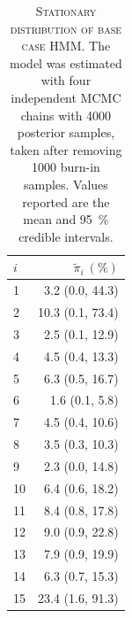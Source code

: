 \clearpage
\begin{table}[h!]
 \centering
 \begin{tabular}{lr}
 \toprule
 $i$ & $\widetilde{\pi}_{i}\ (\si{\percent})$ \\
 \midrule
 1 & 3.2 (0.0, 44.3) \\
 2 & 10.3 (0.1, 73.4) \\
 3 & 2.5 (0.1, 12.9) \\
 4 & 4.5 (0.4, 13.3) \\
 5 & 6.3 (0.5, 16.7) \\
 6 & 1.6 (0.1, 5.8) \\
 7 & 4.5 (0.4, 10.6) \\
 8 & 3.5 (0.3, 10.3) \\
 9 & 2.3 (0.0, 14.8) \\
 10 & 6.4 (0.6, 18.2) \\
 11 & 8.4 (0.8, 17.8) \\
 12 & 9.0 (0.9, 22.8) \\
 13 & 7.9 (0.9, 19.9) \\
 14 & 6.3 (0.7, 15.3) \\
 15 & 23.4 (1.6, 91.3) \\
 \bottomrule
 \end{tabular}
 \caption[Stationary distribution of base case HMM]{\textsc{Stationary distribution of base case HMM}. The model was estimated with four independent MCMC chains with \num{4000} posterior samples, taken after removing \num{1000} burn-in samples. Values reported are the mean and \SI{95}{\percent} credible intervals.}
 \label{tab:base_case_stat_dist}
\end{table}


